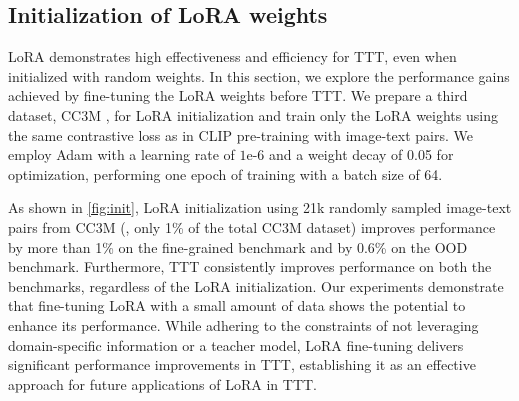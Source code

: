 \subsection{Initialization of LoRA weights}
LoRA demonstrates high effectiveness and efficiency for TTT, even when initialized with random weights.
In this section, we explore the performance gains achieved by fine-tuning the LoRA weights before TTT.
We prepare a third dataset, CC3M \citep{sharma2018conceptual}, for LoRA initialization and train only the LoRA weights using the same contrastive loss as in CLIP pre-training \citep{radford2021learning} with image-text pairs.
We employ Adam with a learning rate of $1\text{e-}6$ and a weight decay of 0.05 for optimization, performing one epoch of training with a batch size of 64.

As shown in \cref{fig:init}, LoRA initialization using 21k randomly sampled image-text pairs from CC3M (\ie, only 1\% of the total CC3M dataset) improves performance by more than 1\% on the fine-grained benchmark and by 0.6\% on the OOD benchmark.
Furthermore, TTT consistently improves performance on both the benchmarks, regardless of the LoRA initialization.
Our experiments demonstrate that fine-tuning LoRA with a small amount of data shows the potential to enhance its performance.
While adhering to the constraints of not leveraging domain-specific information or a teacher model, LoRA fine-tuning delivers significant performance improvements in TTT, establishing it as an effective approach for future applications of LoRA in TTT.

\begin{comment}
\begin{table}[t]
\centering
\caption{\textbf{LoRA weight initialization}}
\label{tab:init}
\begin{adjustbox}{width=0.8\linewidth}
\begin{tabular}{ccc|ccc}
\toprule
Initialization & Data Size & TTT & ImageNet & OOD Average & FG Average \\
\midrule
Kaiming & 0 & & 66.72 & 57.14 & 63.64 \\
Kaiming & 0 & \ding{51} & 69.31 & 61.21 & 65.00 \\
\midrule
CC3M & 21 $\mathrm{k}$ & & 67.92 & 57.74 & 64.80 \\
CC3M & 21 $\mathrm{k}$ & \ding{51} & 70.52 & 62.57 & 65.64 \\
CC3M & 110 $\mathrm{k}$ & & 67.56 & 57.21 & 64.92 \\
CC3M & 110 $\mathrm{k}$ & \ding{51} & 70.24 & 62.16 & 65.94 \\
CC3M & 230 $\mathrm{k}$ & & 66.96 & 56.25 & 64.68 \\
CC3M & 230 $\mathrm{k}$ & \ding{51} & 69.78 & 61.44 & 65.76 \\
\bottomrule
\end{tabular}
\end{adjustbox}
\end{table}
\end{comment}

